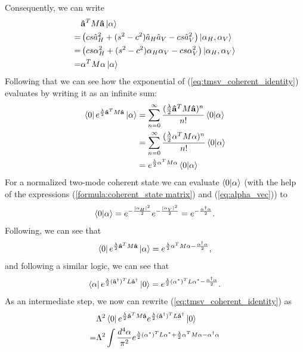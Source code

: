 \documentclass[%
 reprint,
 amsmath,amssymb,
 aps,
twocolumn
]{revtex4-2}
\begin{document}
Consequently, we can write
\begin{align}
    &\mathbf{\hat a}^T M\mathbf{\hat a}\ket{\alpha}\\
    =&\left(cs\hat a_H^2+(s^2-c^2)\hat a_H\hat a_V-cs\hat a_V^2\right)\ket{\alpha_H,\alpha_V}\\
    =&\left(cs\alpha_H^2+(s^2-c^2)\alpha_H\alpha_V-cs\alpha_V^2\right)\ket{\alpha_H,\alpha_V}\\
    =&\alpha^TM\alpha\ket{\alpha}
\end{align}
Following that we can see how the exponential of (\ref{eq:tmsv_coherent_identity}) evaluates by writing it as an infinite sum:
\begin{align}
    \bra{0}e^{\frac{\lambda}{2}\mathbf{\hat a}^T M\mathbf{\hat a}}\ket{\alpha}&=\sum_{n=0}^\infty\dfrac{(\frac{\lambda}{2}\mathbf{\hat a}^T M\mathbf{\hat a})^n}{n!}\braket{0|\alpha}\\
    &=\sum_{n=0}^\infty\dfrac{(\frac{\lambda}{2}\alpha^TM\alpha)^n}{n!}\braket{0|\alpha}\\
    &=e^{\frac{\lambda}{2}\alpha^TM\alpha}\braket{0|\alpha}
\end{align}
For a normalized two-mode coherent state we can evaluate $\braket{0|\alpha}$ (with the help of the expressions (\ref{formula:coherent_state matrix}) and (\ref{eq:alpha_vec})) to
\begin{align}
\braket{0|\alpha}=e^{-\frac{|\alpha_H|^2}{2}}e^{-\frac{|\alpha_V|^2}{2}}=e^{-\frac{\alpha^{\dagger}\alpha}{2}}.
\end{align}
Following, we can see that 
\begin{align}
\bra{0}e^{\frac{\lambda}{2}\mathbf{\hat a}^T M\mathbf{\hat a}}\ket{\alpha}
=e^{\frac{\lambda}{2}\alpha^TM\alpha-\frac{\alpha^{\dagger}\alpha}{2}},
\end{align}
and following a similar logic, we can see that
\begin{align}
\bra{\alpha}e^{\frac{\lambda}{2} (\mathbf{\hat a^{\dagger}})^T L \mathbf{\hat a^{\dagger}}} \ket{0}=e^{\frac{\lambda}{2}(\alpha^*)^TL\alpha^*-\frac{\alpha^{\dagger}\alpha}{2}}.
\end{align}
As an intermediate step, we now can rewrite (\ref{eq:tmsv_coherent_identity}) as
\begin{align}
&\Lambda^2\bra{0} e^{\frac{\lambda}{2} \mathbf{\hat a}^T M\mathbf{\hat a}}
e^{\frac{\lambda}{2} (\mathbf{\hat a^{\dagger}})^T L \mathbf{\hat a^{\dagger}}}\ket{0} \notag\\
=&\Lambda^2\int \dfrac{d^4\alpha}{\pi^2}   e^{\frac{\lambda}{2}(\alpha^*)^TL\alpha^* +\frac{\lambda}{2}\alpha^TM\alpha-\alpha^{\dagger}\alpha}\label{eq:intermediate}
\end{align}
\end{document}

